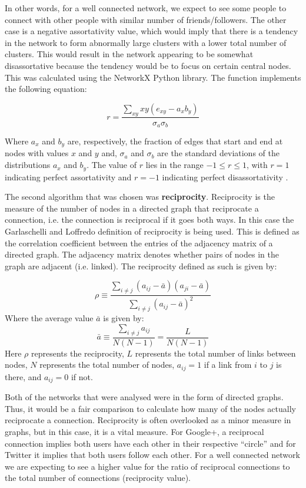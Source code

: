 \documentclass[a4paper, 10pt, conference]{ieeeconf}      %
\begin{document}
In other words, for a well connected network, we expect to see some people to connect with other people with similar number of friends/followers. The other case is a negative assortativity value, which would imply that there is a tendency in the network to form abnormally large clusters with a lower total number of clusters. This would result in the network appearing to be somewhat disassortative because the tendency would be to focus on certain central nodes.
This was calculated using the NetworkX Python library. The function implements the following equation:

\[
r = \frac{\sum_{xy}xy(e_{xy}-a_xb_y)}{\sigma_a\sigma_b}
\]

Where $a_x$ and $b_y$ are, respectively, the fraction of edges that start and end at nodes with values $x$ and $y$ and, $\sigma_a$ and $\sigma_b$ are the standard deviations of the distributions $a_x$ and $b_y$. The value of $r$ lies in the range $−1 \leq r \leq 1$, with $r = 1$ indicating perfect assortativity and $r = −1$ indicating perfect disassortativity \cite{c12}.

The second algorithm that was chosen was \textbf{reciprocity}. Reciprocity is the measure of the number of nodes in a directed graph that reciprocate a connection, i.e. the connection is reciprocal if it goes both ways. In this case the Garlaschelli and Loffredo definition of reciprocity \cite{c9} is being used. This is defined as the correlation coefficient between the entries of the adjacency matrix of a directed graph. The adjacency matrix denotes whether pairs of nodes in the graph are adjacent (i.e. linked). The reciprocity defined as such is given by:

\[
\rho \equiv \frac{\sum_{i\neq j}(a_{ij}-\bar{a})(a_{ji}-\bar{a})}{\sum_{i\neq j}(a_{ij}-\bar{a})^2}
\]
Where the average value $\bar{a}$ is given by:
\[
\bar{a} \equiv \frac{\sum_{i\neq j} a_{ij}}{N(N-1)} = \frac{L}{N(N-1)}
\]
Here $\rho$ represents the reciprocity, $L$ represents the total number of links between nodes, $N$ represents the total number of nodes, $a_{ij} = 1$ if a link from $i$ to $j$ is there, and $a_{ij} = 0$ if not.

Both of the networks that were analysed were in the form of directed graphs. Thus, it would be a fair comparison to calculate how many of the nodes actually reciprocate a connection. Reciprocity is often overlooked as a minor measure in graphs, but in this case, it is a vital measure. For Google+, a reciprocal connection implies both users have each other in their respective “circle” and for Twitter it implies that both users follow each other. 
For a well connected network we are expecting to see a higher value for the ratio of reciprocal connections to the total number of connections (reciprocity value).
\end{document}
